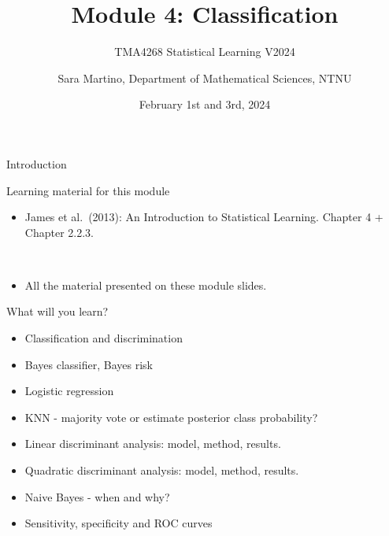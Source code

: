 \documentclass[
  10pt,
  ignorenonframetext,
]{beamer}
\title{Module 4: Classification}
\subtitle{TMA4268 Statistical Learning V2024}
\author{Sara Martino, Department of Mathematical Sciences, NTNU}
\date{February 1st and 3rd, 2024}
\providecommand{\tightlist}{%
  \setlength{\itemsep}{0pt}\setlength{\parskip}{0pt}}
\begin{document}
\frame{\titlepage}

\begin{frame}
\end{frame}

\begin{frame}{Introduction}
\protect\hypertarget{introduction}{}
\begin{block}{Learning material for this module}
\protect\hypertarget{learning-material-for-this-module}{}
\vspace{2mm}

\begin{itemize}
\tightlist
\item
  James et al.~(2013): An Introduction to Statistical Learning. Chapter
  4 + Chapter 2.2.3.
\end{itemize}

\(~\)

\begin{itemize}
\tightlist
\item
  All the material presented on these module slides.
\end{itemize}
\end{block}
\end{frame}

\begin{frame}
\begin{block}{What will you learn?}
\protect\hypertarget{what-will-you-learn}{}
\(~\)

\begin{itemize}
\item
  Classification and discrimination
\item
  Bayes classifier, Bayes risk
\item
  Logistic regression
\item
  KNN - majority vote or estimate posterior class probability?
\item
  Linear discriminant analysis: model, method, results.
\item
  Quadratic discriminant analysis: model, method, results.
\item
  Naive Bayes - when and why?
\item
  Sensitivity, specificity and ROC curves
\end{itemize}
\end{block}
\end{frame}
\end{document}
